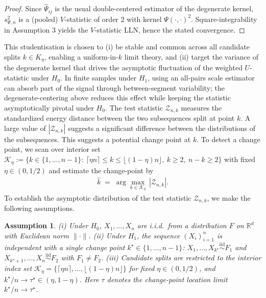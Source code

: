 \documentclass[11pt]{article}
\newtheorem{assumption}{Assumption}
\numberwithin{theorem}{section}
\numberwithin{Lemma}{section}
\numberwithin{Definition}{section}
\newcommand{\iid}{\stackrel{\text{iid}}{\sim}}
\begin{document}
\begin{proof}
Since $\hat{\Psi}_{ij}$ is the usual double-centered estimator of the degenerate kernel, $s_{\Psi,n}^2$ is a (pooled) $V$-statistic of order 2 with kernel $\Psi(\cdot,\cdot)^2$. Square-integrability in Assumption 3 yields the $V$-statistic LLN, hence the stated convergence.
\end{proof}




This studentisation is chosen to (i) be stable and common across all candidate splits $k\in K_\eta$, enabling a uniform-in-$k$ limit theory, and (ii) target the variance of the degenerate kernel that drives the asymptotic fluctuation of the weighted $U$-statistic under $H_0$. In finite samples under $H_1$, using an all-pairs scale estimator can absorb part of the signal through between-segment variability; the degenerate-centering above reduces this effect while keeping the statistic asymptotically pivotal under $H_0$. The test statistic $\mathcal{Z}_{n,k}$ measures the standardized energy distance between the two subsequences split at point $k$. A large value of $|\mathcal{Z}_{n,k}|$ suggests a significant difference between the distributions of the subsequences. This suggests a potential change point at $k$. To detect a change point, we scan over interior set $\mathcal K_\eta:= \bigl\{k\in\{1,\dots,n-1\}:\ \lceil \eta n\rceil \le k \le \lfloor (1-\eta)n\rfloor,\ k\ge 2,\ n-k\ge 2\bigr\}$ with fixed $\eta\in(0,1/2)$ and estimate the change-point by
\begin{equation}\label{m}
\begin{aligned}
\hat k \;=\; \arg\max_{k\in\mathcal K_\eta}\,|\mathcal{Z}_{n,k}|.
\end{aligned}
\end{equation}
To establish the asymptotic distribution of the test statistic $\mathcal{Z}_{n,k}$, we make the following assumptions.


\begin{assumption}\label{A:sampling}
(i) Under $H_0$, $X_1,\dots,X_n$ are i.i.d.\ from a distribution $F$ on $\mathbb{R}^d$ with Euclidean norm $\|\cdot\|$. 
(ii) Under $H_1$, the sequence $(X_i)_{i=1}^n$ is independent with a single change point $k^\star \in\{1,\dots,n-1\}$: $X_1,\dots,X_{k^\star} \iid F_1$ and $X_{k^\star+1},\dots,X_n \iid F_2$ with $F_1\neq F_2$. 
(iii) Candidate splits are restricted to the interior index set $\mathcal K_\eta=\{\lceil\eta n\rceil,\dots,\lfloor(1-\eta)n\rfloor\}$ for fixed $\eta\in(0,1/2)$, and $k^\star/n\to\tau^\star\in(\eta,1-\eta)$. Here $\tau$ denotes the change-point location limit $k^\star/n\to\tau^\star$.
\end{assumption}
\end{document}
